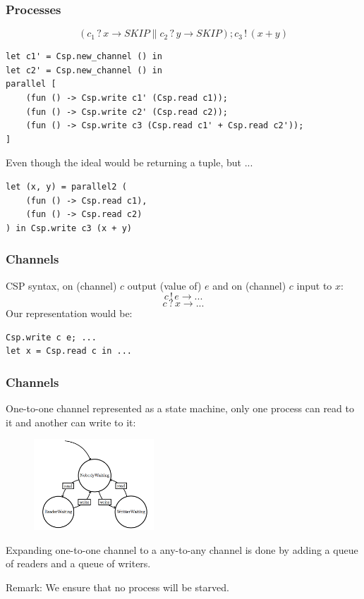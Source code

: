 \documentclass{beamer}
\begin{document}
\begin{frame}[fragile]
  \frametitle{Processes}
    \[(c_1\,?\,x \to SKIP \parallel c_2\,?\,y \to SKIP); c_3\,!\,(x + y)\]
\scriptsize
\begin{verbatim}
let c1' = Csp.new_channel () in
let c2' = Csp.new_channel () in
parallel [
    (fun () -> Csp.write c1' (Csp.read c1));
    (fun () -> Csp.write c2' (Csp.read c2));
    (fun () -> Csp.write c3 (Csp.read c1' + Csp.read c2'));
]
\end{verbatim}
\normalsize
Even though the ideal would be returning a tuple, but ...
\scriptsize
\begin{verbatim}
let (x, y) = parallel2 (
    (fun () -> Csp.read c1), 
    (fun () -> Csp.read c2)
) in Csp.write c3 (x + y)
\end{verbatim}
\normalsize
\end{frame}


\begin{frame}[fragile]
  \frametitle{Channels}
  CSP syntax, on (channel) $c$ output (value of) $e$ and on (channel) $c$ input
  to $x$:
    \[c\,!\,e \to ...\]
    \[c\,?\,x \to ...\]
  Our representation would be:
\scriptsize
\begin{verbatim}
Csp.write c e; ...
let x = Csp.read c in ...
\end{verbatim}
\normalsize
\end{frame}

\begin{frame}
  \frametitle{Channels}
  One-to-one channel represented as a state machine, only one process can read
  to it and another can write to it:
  \begin{figure}[htp]
    \begin{center}
      \includegraphics[width=4.5cm,keepaspectratio=true]{figures/channels.png}
    \end{center}
  \end{figure}
  Expanding one-to-one channel to a any-to-any channel is done by adding a queue
  of readers and a queue of writers.

  Remark: We ensure that no process will be starved. 
\end{frame}
\end{document}

